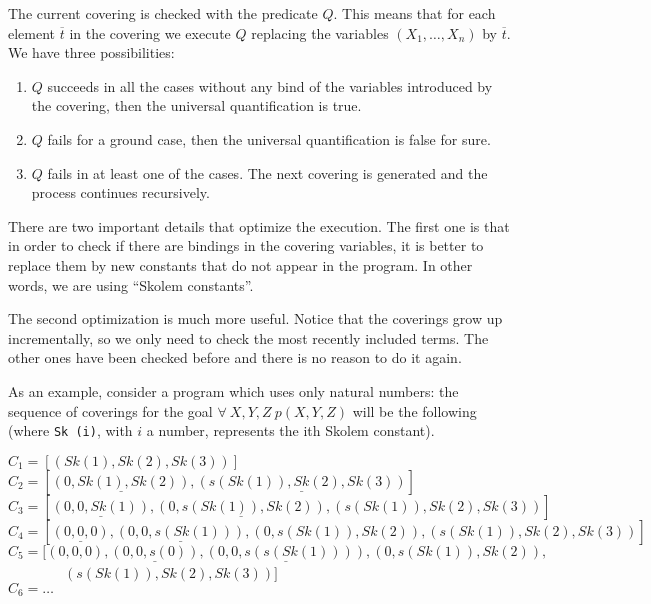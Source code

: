 \documentclass[]{llncs}
\newenvironment{mytabbing}
   {\vspace{0.3em}\begin{small}\begin{tabbing}}
   {\end{tabbing}\end{small}\vspace{0.3em}}
\begin{document}
The current covering is checked with the predicate $Q$. This
means that for each element $\overline{t}$ in the covering
we execute $Q$ replacing the variables $(X_1, \ldots, X_n)$ by
$\overline{t}$. We have three possibilities:
\begin{enumerate}
\item $Q$ succeeds in all the cases without any bind of the
variables introduced by the covering, then the universal
quantification is true.
\item $Q$ fails for a ground case, then the universal quantification
is false for sure.
\item $Q$ fails in at least one of the cases. The next covering
is generated and the process continues recursively.
\end{enumerate}

There are two important details that optimize the execution.
The first one is that in order to check if there are bindings
in the covering variables, it is better to replace them by
new constants that do not appear in the program. In other words,
we are using ``Skolem constants''.

The second optimization is much more useful. Notice that the
coverings grow up incrementally, so we only need to check the
most recently included terms. The other ones have been checked
before and there is no reason to do it again.

As an example, consider a program which uses only natural
numbers: the sequence of coverings for the
goal $\forall~ X,Y,Z ~ p(X,Y,Z)$ will be the following
 (where {\tt Sk (i)}, with $i$ a number, represents the ith
Skolem constant).
\begin{small}
\begin{mytabbing}
$C_1 = [(Sk(1),Sk(2),Sk(3))]$ \\
$C_2 = [\underline{(0,Sk(1),Sk(2))}, \underline{(s(Sk(1)),Sk(2),Sk(3))}]$ \\
$C_3 = [\underline{(0,0,Sk(1))}, \underline{(0,s(Sk(1)),Sk(2))},
        (s(Sk(1)),Sk(2),Sk(3))]$ \\
$C_4 = [\underline{(0,0,0)}, \underline{(0,0,s(Sk(1)))},
        (0,s(Sk(1)),Sk(2)),(s(Sk(1)),Sk(2),Sk(3))]$ \\
$C_5 = [(0,0,0), \underline{(0,0,s(0))}, \underline{(0,0,s(s(Sk(1))))},
        (0,s(Sk(1)),Sk(2)),$ \\
~~~~~~~~$        (s(Sk(1)),Sk(2),Sk(3))]$\\
$C_6 = \ldots$
\end{mytabbing}
\end{small}
\end{document}
